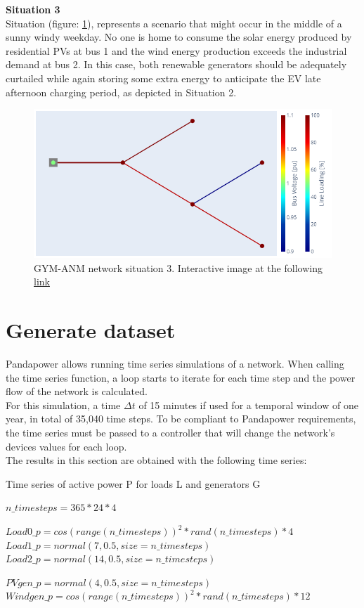 \noindent \textbf{Situation 3} \\
    Situation (figure: \ref{fig:net_sit3}), represents a scenario that might occur in the middle of a sunny windy weekday. No one is home to consume the solar energy produced by residential PVs at bus 1 and the wind energy production exceeds the industrial demand at bus 2. In this case, both renewable generators should be
    adequately curtailed while again storing some extra energy to anticipate the EV late afternoon charging period, as depicted in Situation 2.
    \begin{figure}[h]
    \centering
        \includegraphics[width=.7\linewidth]{images/GYM-ANM/NETS/Gyn-anm network situation3.png}
    \caption[GYM-ANM network situation 3]{GYM-ANM network situation 3. Interactive image at the following \href{https://htmlpreview.github.io/?https://github.com/MauriVass/ThesisLiege/blob/master/Images/fig_case3.html}{link}}
    \label{fig:net_sit3}
    \end{figure}
    
\section{Generate dataset}
Pandapower allows running time series simulations of a network. When calling the time series function, a loop starts to iterate for each time step and the power flow of the network is calculated.\\
For this simulation, a time $\Delta t$ of 15 minutes if used for a temporal window of one year, in total of 35,040 time steps. To be compliant to Pandapower requirements, the time series must be passed to a controller that will change the network's devices values for each loop.\\
The results in this section are obtained with the following time series:

\begin{algorithm}[H]
\caption{Time series of active power \gls{P} for loads \gls{L} and generators \gls{G}}
\label{alg:timeseries}
\begin{algorithmic}[1]
\State $n\_timesteps = 365 * 24 * 4$

\State $Load0\_p = cos(range(n\_timesteps))^2* rand(n\_timesteps)*4$
\State $Load1\_p = normal(7,0.5, size=n\_timesteps)$
\State $Load2\_p = normal(14,0.5, size=n\_timesteps)$

\State $PVgen\_p = normal(4,0.5, size=n\_timesteps)$
\State $Windgen\_p = cos(range(n\_timesteps))^2*rand(n\_timesteps)*12$

\end{algorithmic}
\end{algorithm}

